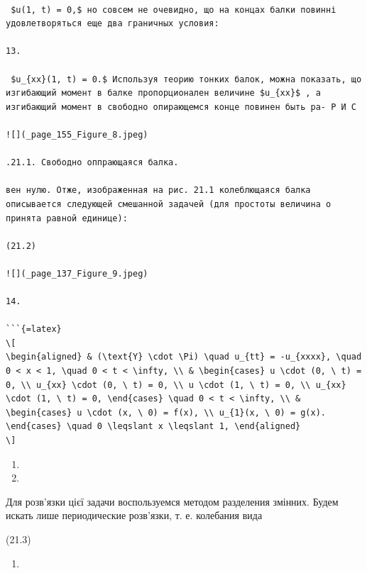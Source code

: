 \documentclass[
  ukrainian,
]{article}
\providecommand{\tightlist}{%
  \setlength{\itemsep}{0pt}\setlength{\parskip}{0pt}}
\begin{document}
\begin{verbatim}

 $u(1, t) = 0,$ но совсем не очевидно, що на концах балки повинні удовлетворяться еще два граничных условия:

13.

 $u_{xx}(1, t) = 0.$ Используя теорию тонких балок, можна показать, що изгибающий момент в балке пропорционален величине $u_{xx}$ , а изгибающий момент в свободно опирающемся конце повинен быть ра- Р И С

![](_page_155_Figure_8.jpeg)

.21.1. Свободно оппрающаяся балка.

вен нулю. Отже, изображенная на рис. 21.1 колеблющаяся балка описывается следующей смешанной задачей (для простоты величина о принята равной единице):

(21.2)

![](_page_137_Figure_9.jpeg)

14.

```{=latex}
\[
\begin{aligned} & (\text{Y} \cdot \Pi) \quad u_{tt} = -u_{xxxx}, \quad 0 < x < 1, \quad 0 < t < \infty, \\ & \begin{cases} u \cdot (0, \ t) = 0, \\ u_{xx} \cdot (0, \ t) = 0, \\ u \cdot (1, \ t) = 0, \\ u_{xx} \cdot (1, \ t) = 0, \end{cases} \quad 0 < t < \infty, \\ & \begin{cases} u \cdot (x, \ 0) = f(x), \\ u_{1}(x, \ 0) = g(x). \end{cases} \quad 0 \leqslant x \leqslant 1, \end{aligned}
\]
\end{verbatim}

\begin{enumerate}
\def\labelenumi{\arabic{enumi}.}
\setcounter{enumi}{14}
\tightlist
\item
\item
\end{enumerate}

Для розв'язки цієї задачи воспользуемся методом разделения змінних.
Будем искать лише периодические розв'язки, т. е. колебания вида

(21.3)

\begin{enumerate}
\def\labelenumi{\arabic{enumi}.}
\setcounter{enumi}{16}
\tightlist
\item
\end{enumerate}
\end{document}
